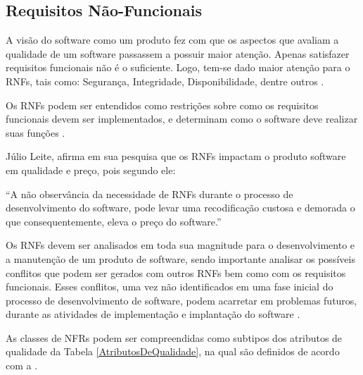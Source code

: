 \subsection{Requisitos Não-Funcionais}
\label{subsec:requisitosNaoFuncionais}

A visão do software como um produto fez com que os aspectos que avaliam a qualidade de um software passassem a possuir maior atenção. Apenas satisfazer requisitos funcionais não é o suficiente. Logo, tem-se dado maior atenção para o RNFs, tais como: Segurança, Integridade, Disponibilidade, dentre outros \cite{cysneiros1997definindo}.

Os RNFs podem ser entendidos como restrições sobre como os requisitos funcionais devem ser implementados, e determinam como o software deve realizar suas funções \cite{sommerville1997requirements}.


Júlio Leite, afirma em sua pesquisa que os RNFs impactam o produto software em qualidade e preço, pois segundo ele:

\begin{citacao}
	“A não observância da necessidade de RNFs durante o processo de desenvolvimento do software, pode levar uma recodificação custosa e demorada o que consequentemente, eleva o preço do software.” \cite[p. 2]{cysneiros1997definindo}
\end{citacao}


Os RNFs devem ser analisados em toda sua magnitude para o desenvolvimento e a manutenção de um produto de software, sendo importante analisar os possíveis conflitos que podem ser gerados com outros RNFs bem como com os requisitos funcionais. Esses conflitos, uma vez não identificados em uma fase inicial do processo de desenvolvimento de software, podem acarretar em problemas futuros, durante as atividades de implementação e implantação do software \cite{cysneiros1997definindo}. 


As classes de NFRs \cite{eckhardt2016non} podem ser compreendidas como subtipos dos atributos de qualidade da Tabela \ref{AtributosDeQualidade}, na qual são definidos de acordo com a \cite{organizacion2011iso}. 

